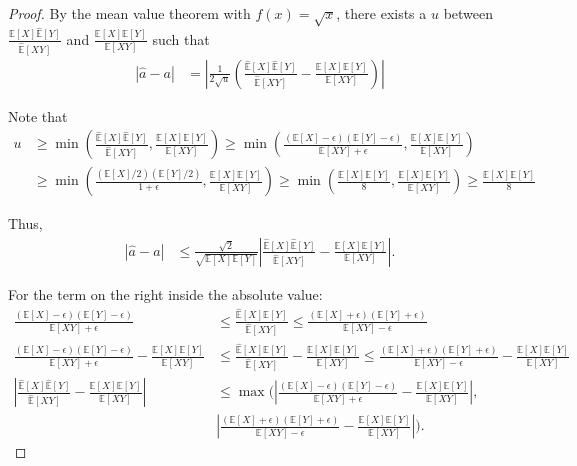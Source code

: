 \begin{proof}
By the mean value theorem with $f(x) = \sqrt{x}$, there exists a $u$ between $\frac{\hat{\mathbb{E}}[X] \hat{\mathbb{E}}[Y]}{\hat{\mathbb{E}}[XY]}$ and $\frac{\mathbb{E}[X] \mathbb{E}[Y]}{\mathbb{E}[XY]}$ such that 
\begin{align}
    \left| \hat{a} -  a \right| &= \left| \frac{1}{2\sqrt{u}} \left(\frac{\hat{\mathbb{E}}[X] \hat{\mathbb{E}}[Y]}{\hat{\mathbb{E}}[XY]} - \frac{\mathbb{E}[X] \mathbb{E}[Y]}{\mathbb{E}[XY]} \right) \right|
\end{align}

Note that 
\begin{align}
    u &\geq \min \left( \frac{\hat{\mathbb{E}}[X] \hat{\mathbb{E}}[Y]}{\hat{\mathbb{E}}[XY]}, \frac{\mathbb{E}[X] \mathbb{E}[Y]}{\mathbb{E}[XY]} \right) \geq \min \left( \frac{(\mathbb{E}[X] - \epsilon) (\mathbb{E}[Y] - \epsilon)}{\mathbb{E}[XY] + \epsilon}, \frac{\mathbb{E}[X] \mathbb{E}[Y]}{\mathbb{E}[XY]} \right) \\
      &\geq \min \left( \frac{(\mathbb{E}[X]/2) (\mathbb{E}[Y]/2)}{1 + \epsilon}, \frac{\mathbb{E}[X] \mathbb{E}[Y]}{\mathbb{E}[XY]} \right) \geq \min \left( \frac{\mathbb{E}[X] \mathbb{E}[Y]}{8}, \frac{\mathbb{E}[X] \mathbb{E}[Y]}{\mathbb{E}[XY]} \right) \geq \frac{\mathbb{E}[X] \mathbb{E}[Y]}{8}
\end{align}

Thus,
\begin{align}
    | \hat{a} -  a | &\leq \frac{\sqrt{2}}{\sqrt{\mathbb{E}[X] \mathbb{E}[Y]}} \left| \frac{\hat{\mathbb{E}}[X] \hat{\mathbb{E}}[Y]}{\hat{\mathbb{E}}[XY]} - \frac{\mathbb{E}[X] \mathbb{E}[Y]}{\mathbb{E}[XY]}  \right|.
\end{align}

For the term on the right inside the absolute value:
\begin{align}
    \frac{(\mathbb{E}[X] - \epsilon)(\mathbb{E}[Y] - \epsilon)}{\mathbb{E}[XY] + \epsilon} &\leq \frac{\hat{\mathbb{E}}[X] \hat{\mathbb{E}}[Y]}{\hat{\mathbb{E}}[XY]} \leq \frac{(\mathbb{E}[X] + \epsilon)(\mathbb{E}[Y] + \epsilon)}{\mathbb{E}[XY] - \epsilon} \\
    \frac{(\mathbb{E}[X] - \epsilon)(\mathbb{E}[Y] - \epsilon)}{\mathbb{E}[XY] + \epsilon}  - \frac{\mathbb{E}[X] \mathbb{E}[Y]}{\mathbb{E}[XY]} &\leq \frac{\hat{\mathbb{E}}[X] \hat{\mathbb{E}}[Y]}{\hat{\mathbb{E}}[XY]} - \frac{\mathbb{E}[X] \mathbb{E}[Y]}{\mathbb{E}[XY]} \leq \frac{(\mathbb{E}[X] + \epsilon)(\mathbb{E}[Y] + \epsilon)}{\mathbb{E}[XY] - \epsilon} - \frac{\mathbb{E}[X] \mathbb{E}[Y]}{\mathbb{E}[XY]} \\
    \left| \frac{\hat{\mathbb{E}}[X] \hat{\mathbb{E}}[Y]}{\hat{\mathbb{E}}[XY]} - \frac{\mathbb{E}[X] \mathbb{E}[Y]}{\mathbb{E}[XY]} \right| &\leq \max \bigg( \left|  \frac{(\mathbb{E}[X] - \epsilon)(\mathbb{E}[Y] - \epsilon)}{\mathbb{E}[XY] + \epsilon}  - \frac{\mathbb{E}[X] \mathbb{E}[Y]}{\mathbb{E}[XY]} \right|, \\
    &\left| \frac{(\mathbb{E}[X] + \epsilon)(\mathbb{E}[Y] + \epsilon)}{\mathbb{E}[XY] - \epsilon} - \frac{\mathbb{E}[X] \mathbb{E}[Y]}{\mathbb{E}[XY]} \right| \bigg).
\end{align}


\end{proof}
